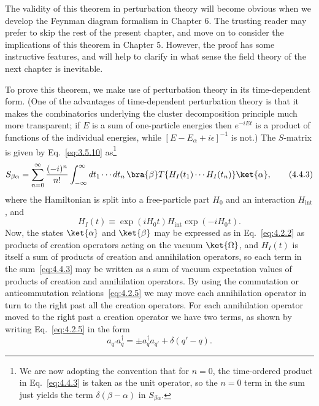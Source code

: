 The validity of this theorem in perturbation theory will become obvious when we
develop the Feynman diagram formalism in Chapter 6. The trusting reader may
prefer to skip the rest of the present chapter, and move on to consider the
implications of this theorem in Chapter 5. However, the proof has some
instructive features, and will help to clarify in what sense the field theory of
the next chapter is inevitable.

To prove this theorem, we make use of perturbation theory in its time-dependent
form. (One of the advantages of time-dependent perturbation theory is that it
makes the combinatorics underlying the cluster decomposition principle much
more transparent; if $E$ is a sum of one-particle energies then $e^{-iEt}$ is a
product of functions of the individual energies, while
$[E-E_\alpha+i\epsilon]^{-1}$ is not.) The $S$-matrix is given by Eq.~\eqref{eq:3.5.10}
as\footnote{We are now adopting the convention that for $n=0$, the time-ordered
product in Eq.~\eqref{eq:4.4.3} is taken as the unit operator, so the $n=0$ term in the
sum just yields the term $\delta(\beta-\alpha)$ in $S_{\beta\alpha}$.}
\begin{equation}
S_{\beta\alpha}=\sum_{n=0}^{\infty}\frac{(-i)^n}{n!}
 \int_{-\infty}^{\infty}dt_1\cdots dt_n\,
 \bra{\beta}T\{H_I(t_1)\cdots H_I(t_n)\}\ket{\alpha},
\tag{4.4.3}
\label{eq:4.4.3}
\end{equation}
where the Hamiltonian is split into a free-particle part $H_0$ and an
interaction $H_{\mathrm{int}}$, and
\begin{equation}
H_I(t)\equiv \exp(iH_0t)H_{\mathrm{int}}\exp(-iH_0t).
\tag{4.4.4}
\label{eq:4.4.4}
\end{equation}
Now, the states $\ket{\alpha}$ and $\ket{\beta}$ may be expressed as in
Eq.~\eqref{eq:4.2.2} as products of creation operators acting on the vacuum
$\ket{\Omega}$, and $H_I(t)$ is itself a sum of products of creation and
annihilation operators, so each term in the sum~\eqref{eq:4.4.3} may be written as a sum
of vacuum expectation values of products of creation and annihilation
operators. By using the commutation or anticommutation relations~\eqref{eq:4.2.5} we may
move each annihilation operator in turn to the right past all the creation
operators. For each annihilation operator moved to the right past a creation
operator we have two terms, as shown by writing Eq.~\eqref{eq:4.2.5} in the form
\[
a_{q'}a^\dagger_q=\mathbin{\pm}a^\dagger_q a_{q'}+\delta(q'-q).
\]

